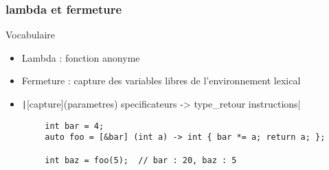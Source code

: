 \documentclass[C++.tex]{subfiles}
\begin{document}
\begin{frame}[fragile]
	\frametitle{lambda et fermeture}
	\begin{block}{Vocabulaire}
		\begin{itemize}
			\item Lambda : fonction anonyme
			\item Fermeture : capture des variables libres de l'environnement lexical
		\end{itemize}
	\end{block}

	\begin{itemize}
		\item \texttt|[capture](parametres) specificateurs -> type_retour {instructions}|
	\end{itemize}

	\begin{verbatim}
		int bar = 4;
		auto foo = [&bar] (int a) -> int { bar *= a; return a; };

		int baz = foo(5);  // bar : 20, baz : 5
	\end{verbatim}

\end{frame}
\end{document}
